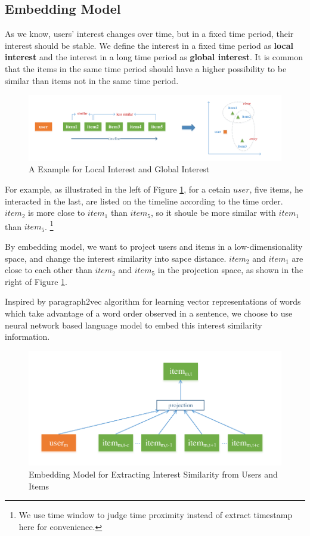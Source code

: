 \documentclass{sig-alternate-05-2015}
\begin{document}
\subsection{Embedding Model}
As we know, users' interest changes over time,
but in a fixed time period, their interest should be stable.
We define the interest in a fixed time period as \textbf{local interest}
and the interest in a long time period as \textbf{global interest}.
It is common that the items in the same time period
should have a higher possibility to be similar than
items not in the same time period.

\begin{figure}[htbp]
	\centering
	\includegraphics[scale=0.6]{images/1.pdf}
	\caption{A Example for Local Interest and Global Interest}
	\label{fig:example}
\end{figure}

For example, as illustrated in the left of Figure \ref{fig:example},
for a cetain $user$, five items, he interacted in the last,
are listed on the timeline according to the time order.
$item_2$ is more close to $item_1$ than $item_5$,
so it shoule be more similar with $item_1$ than $item_5$.
\footnote{We use time window to judge time proximity instead of extract timestamp here for convenience.}

By embedding model, we want to project users and items in a low-dimensionality space,
and change the interest similarity into sapce distance.
$item_2$ and $item_1$ are close to each other than $item_2$ and $item_5$
in the projection space, as shown in the right of Figure \ref{fig:example}.

Inspired by paragraph2vec algorithm \cite{le2014distributed} for learning vector representations of words
which take advantage of a word order observed in a sentence,
we choose to use neural network based language model
to embed this interest similarity information.

\begin{figure}[htbp]
	\centering
	\includegraphics[scale=0.55]{images/2.pdf}
	\caption{Embedding Model for Extracting Interest Similarity from Users and Items}
	\label{fig:embedding}
\end{figure}
\end{document}
